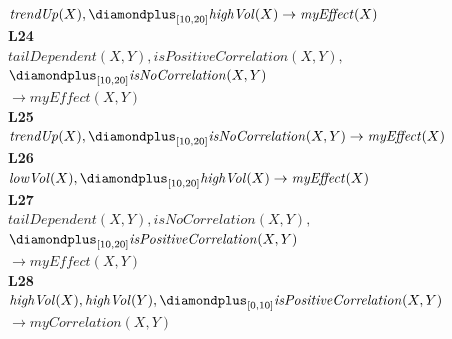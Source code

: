 \begin{figure}[t]
{\begin{minipage}{0.95\textwidth}
\hspace*{1.5em}\mbox{$\mathit{trendUp}(X), \diamondplus_{[10,20]} \mathit{highVol}(X) \to \mathit{myEffect}(X)$}\\[4pt]
\textbf{L24}\\
\hspace*{1.5em}\mbox{$\mathit{tailDependent}(X,Y), \mathit{isPositiveCorrelation}(X,Y),$}\\
\hspace*{1.5em}\hspace*{1.5em}\mbox{$\diamondplus_{[10,20]} \mathit{isNoCorrelation}(X,Y)$}\\
\hspace*{1.5em}\hspace*{3em}\mbox{$\to \mathit{myEffect}(X,Y)$}\\[4pt]
\textbf{L25}\\
\hspace*{1.5em}\mbox{$\mathit{trendUp}(X), \diamondplus_{[10,20]} \mathit{isNoCorrelation}(X,Y) \to \mathit{myEffect}(X)$}\\[4pt]
\textbf{L26}\\
\hspace*{1.5em}\mbox{$\mathit{lowVol}(X), \diamondplus_{[10,20]} \mathit{highVol}(X) \to \mathit{myEffect}(X)$}\\[4pt]
\textbf{L27}\\
\hspace*{1.5em}\mbox{$\mathit{tailDependent}(X,Y), \mathit{isNoCorrelation}(X,Y),$}\\
\hspace*{1.5em}\hspace*{1.5em}\mbox{$\diamondplus_{[10,20]} \mathit{isPositiveCorrelation}(X,Y)$}\\
\hspace*{1.5em}\hspace*{3em}\mbox{$\to \mathit{myEffect}(X,Y)$}\\[4pt]
\textbf{L28}\\
\hspace*{1.5em}\mbox{$\mathit{highVol}(X), \mathit{highVol}(Y), \diamondplus_{[0,10]} \mathit{isPositiveCorrelation}(X,Y)$}\\
\hspace*{1.5em}\hspace*{3em}\mbox{$\to \mathit{myCorrelation}(X,Y)$}\\[4pt]

\end{minipage}}
\end{figure}
